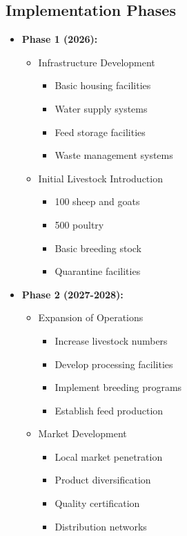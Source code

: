 \subsection{Implementation Phases}
\begin{itemize}
    \item \textbf{Phase 1 (2026):}
    \begin{itemize}
        \item Infrastructure Development
        \begin{itemize}
            \item Basic housing facilities
            \item Water supply systems
            \item Feed storage facilities
            \item Waste management systems
        \end{itemize}
        
        \item Initial Livestock Introduction
        \begin{itemize}
            \item 100 sheep and goats
            \item 500 poultry
            \item Basic breeding stock
            \item Quarantine facilities
        \end{itemize}
    \end{itemize}
    
    \item \textbf{Phase 2 (2027-2028):}
    \begin{itemize}
        \item Expansion of Operations
        \begin{itemize}
            \item Increase livestock numbers
            \item Develop processing facilities
            \item Implement breeding programs
            \item Establish feed production
        \end{itemize}
        
        \item Market Development
        \begin{itemize}
            \item Local market penetration
            \item Product diversification
            \item Quality certification
            \item Distribution networks
        \end{itemize}
    \end{itemize}
    

\end{itemize}
